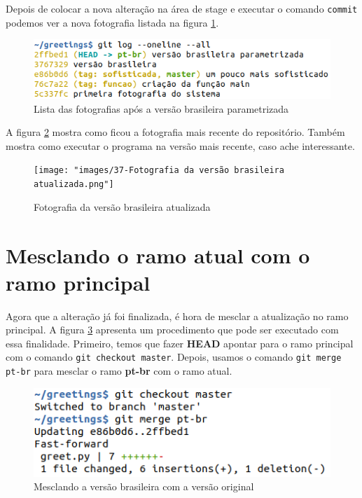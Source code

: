 \documentclass[a4paper]{book}
\begin{document}
Depois de colocar a nova alteração na área de stage
e executar o comando \texttt{commit} podemos ver a nova 
fotografia listada na figura \ref{fig:38}.

\begin{figure}[ht]
\caption{Lista das fotografias após a versão brasileira parametrizada}
\label{fig:38}
\centering
\includegraphics[scale=0.6,left]{"images/38-Lista das fotografias após a versão brasileira parametrizada.png"}
\end{figure}

A figura \ref{fig:37} mostra como ficou a fotografia
mais recente do repositório.
Também mostra como executar o programa na versão
mais recente, caso ache interessante.

\begin{figure}[ht]
\caption{Fotografia da versão brasileira atualizada}
\label{fig:37}
\centering
\texttt{[image: "images/37-Fotografia da versão brasileira atualizada.png"]}
\end{figure}

\section{Mesclando o ramo atual com o ramo principal}

Agora que a alteração já foi finalizada, é hora de 
mesclar a atualização no ramo principal.
A figura \ref{fig:39} apresenta um procedimento que pode
ser executado com essa finalidade.
Primeiro, temos que fazer \textbf{HEAD} apontar
para o ramo principal com o comando 
\texttt{git checkout master}.
Depois, usamos o comando \texttt{git merge pt-br}
para mesclar o ramo \textbf{pt-br} com o ramo atual.

\begin{figure}[ht]
\caption{Mesclando a versão brasileira com a versão original}
\label{fig:39}
\centering
\includegraphics[scale=0.6,left]{"images/39-Mesclando a versão brasileira com a versão original.png"}
\end{figure}
\end{document}
